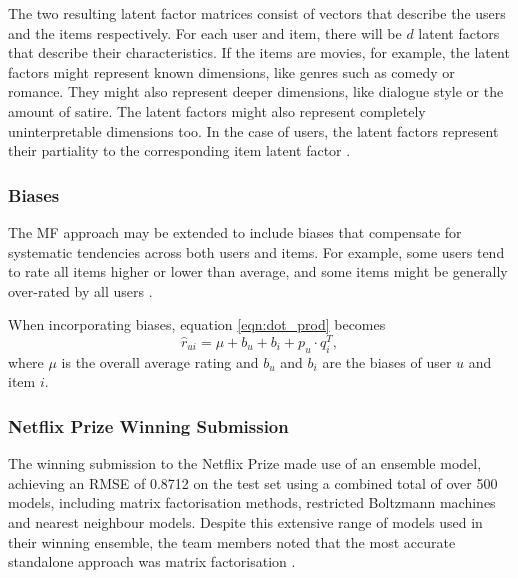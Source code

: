 The two resulting latent factor matrices consist of vectors that describe the users and the items respectively. For each user and item, there will be $d$ latent factors that describe their characteristics. If the items are movies, for example, the latent factors might represent known dimensions, like genres such as comedy or romance. They might also represent deeper dimensions, like dialogue style or the amount of satire. The latent factors might also represent completely uninterpretable dimensions too. In the case of users, the latent factors represent their partiality to the corresponding item latent factor \parencite{koren2009matrix}.

\subsubsection{Biases}
The MF approach may be extended to include biases that compensate for systematic tendencies across both users and items. For example, some users tend to rate all items higher or lower than average, and some items might be generally over-rated by all users \parencite{koren2009matrix}.

When incorporating biases, equation \ref{eqn:dot_prod} becomes
\begin{equation}
    \hat{r}_{ui} = \mu + b_u + b_i + p_u \cdot q_i^T,
\label{eqn:dot_bias}
\end{equation}
where $\mu$ is the overall average rating and $b_u$ and $b_i$ are the biases of user $u$ and item $i$.

\subsubsection{Netflix Prize Winning Submission}
The winning submission to the Netflix Prize made use of an ensemble model, achieving an RMSE of 0.8712 on the test set using a combined total of over 500 models, including matrix factorisation methods, restricted Boltzmann machines and nearest neighbour models. Despite this extensive range of models used in their winning ensemble, the team members noted that the most accurate standalone approach was matrix factorisation \parencite{netflix_bellkor}. 

